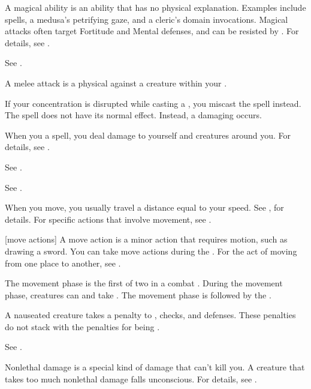  A magical ability is an ability that has no physical explanation.
Examples include spells, a medusa's petrifying gaze, and a cleric's domain invocations.
Magical attacks often target Fortitude and Mental defenses, and can be resisted by .
For details, see .

 See .

 A melee attack is a physical  against a creature within your .

 If your concentration is disrupted while casting a , you miscast the spell instead.
The spell does not have its normal effect.
Instead, a damaging  occurs.

 When you  a spell, you deal damage to yourself and creatures around you.
For details, see .

 See .

 See .

 When you move, you usually travel a distance equal to your speed.
See , for details.
For specific actions that involve movement, see .

[move actions] A move action is a minor action that requires motion, such as drawing a sword.
You can take move actions during the .
For the act of moving from one place to another, see .

 The movement phase is the first of two  in a combat .
During the movement phase, creatures can  and take .
The movement phase is followed by the .

 A nauseated creature takes a  penalty to , checks, and defenses.
These penalties do not stack with the penalties for being \sickened.

 See .

 Nonlethal damage is a special kind of damage that can't kill you.
A creature that takes too much nonlethal damage falls unconscious.
For details, see .

